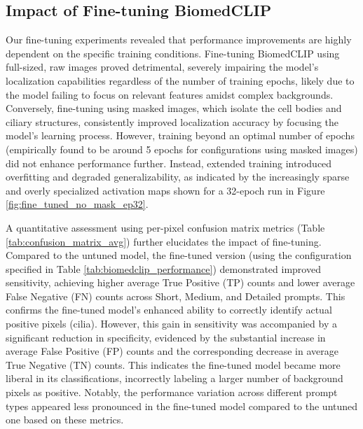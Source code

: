\documentclass[./dissertation.tex]{subfiles}
\begin{document}
\subsection{Impact of Fine-tuning BiomedCLIP}

Our fine-tuning experiments revealed that performance improvements are highly dependent on the specific training conditions. Fine-tuning BiomedCLIP using full-sized, raw images proved detrimental, severely impairing the model's localization capabilities regardless of the number of training epochs, likely due to the model failing to focus on relevant features amidst complex backgrounds. Conversely, fine-tuning using masked images, which isolate the cell bodies and ciliary structures, consistently improved localization accuracy by focusing the model's learning process. However, training beyond an optimal number of epochs (empirically found to be around 5 epochs for configurations using masked images) did not enhance performance further. Instead, extended training introduced overfitting and degraded generalizability, as indicated by the increasingly sparse and overly specialized activation maps shown for a 32-epoch run in Figure \ref{fig:fine_tuned_no_mask_ep32}.

A quantitative assessment using per-pixel confusion matrix metrics (Table \ref{tab:confusion_matrix_avg}) further elucidates the impact of fine-tuning. Compared to the untuned model, the fine-tuned version (using the configuration specified in Table \ref{tab:biomedclip_performance}) demonstrated improved sensitivity, achieving higher average True Positive (TP) counts and lower average False Negative (FN) counts across Short, Medium, and Detailed prompts. This confirms the fine-tuned model's enhanced ability to correctly identify actual positive pixels (cilia). However, this gain in sensitivity was accompanied by a significant reduction in specificity, evidenced by the substantial increase in average False Positive (FP) counts and the corresponding decrease in average True Negative (TN) counts. This indicates the fine-tuned model became more liberal in its classifications, incorrectly labeling a larger number of background pixels as positive. Notably, the performance variation across different prompt types appeared less pronounced in the fine-tuned model compared to the untuned one based on these metrics.
\end{document}
